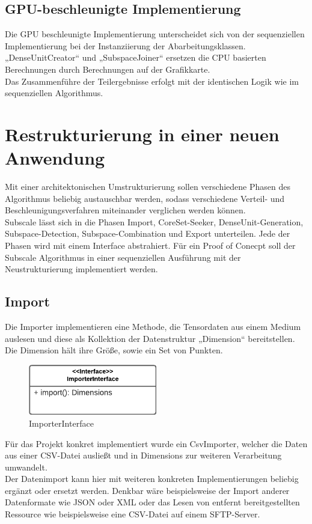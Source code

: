 \subsection{GPU-beschleunigte Implementierung}
Die GPU beschleunigte Implementierung unterscheidet sich von der sequenziellen Implementierung bei der Instanziierung der Abarbeitungsklassen. „DenseUnitCreator“ und „SubspaceJoiner“ ersetzen die CPU basierten Berechnungen durch Berechnungen auf der Grafikkarte.\\
Das Zusammenführe der Teilergebnisse erfolgt mit der identischen Logik wie im sequenziellen Algorithmus.

\section{Restrukturierung in einer neuen Anwendung}
Mit einer architektonischen Umstrukturierung sollen verschiedene Phasen des Algorithmus beliebig austauschbar werden, sodass verschiedene Verteil- und Beschleunigungsverfahren miteinander verglichen werden können.\\
Subscale lässt sich in die Phasen Import, CoreSet-Seeker, DenseUnit-Generation, Subspace-Detection, Subspace-Combination und Export unterteilen. Jede der Phasen wird mit einem Interface abstrahiert. Für ein Proof of Conecpt soll der Subscale Algorithmus in einer sequenziellen Ausführung mit der Neustrukturierung implementiert werden.

\subsection{Import}
Die Importer implementieren eine Methode, die Tensordaten aus einem Medium auslesen und diese als Kollektion der Datenstruktur „Dimension“ bereitstellen. Die Dimension hält ihre Größe, sowie ein Set von Punkten.
\begin{figure}[h]
	\centering
	\includegraphics[width=0.5\textwidth]{./Bilder/Restrukturierung/Importer.png}
	\caption{ImporterInterface}
\end{figure}
Für das Projekt konkret implementiert wurde ein CsvImporter, welcher die Daten aus einer CSV-Datei ausließt und in Dimensions zur weiteren Verarbeitung umwandelt.\\
Der Datenimport kann hier mit weiteren konkreten Implementierungen beliebig ergänzt oder ersetzt werden. Denkbar wäre beispielsweise der Import anderer Datenformate wie JSON oder XML oder das Lesen von entfernt bereitgestellten Ressource wie beispielsweise eine CSV-Datei auf einem SFTP-Server.

